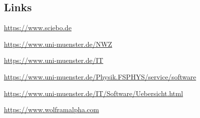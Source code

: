 \begin{multicols*}{2}
\subsection{Links}
\begin{flushleft}
	\begin{fibelurl}
		\url{https://www.sciebo.de}
		\label{internet:sciebo}
	\end{fibelurl}
	\begin{fibelurl}
		\url{https://www.uni-muenster.de/NWZ}
		\label{internet:ivvnwz}
	\end{fibelurl}
	\begin{fibelurl}
		\url{https://www.uni-muenster.de/IT}
		\label{internet:wwuit}
	\end{fibelurl}
	\begin{fibelurl}
		\url{https://www.uni-muenster.de/Physik.FSPHYS/service/software}
		\label{internet:fsphys_software}
	\end{fibelurl}
	\begin{fibelurl}
		\url{https://www.uni-muenster.de/IT/Software/Uebersicht.html}
		\label{internet:wwuit_software}
	\end{fibelurl}
	\begin{fibelurl}
		\url{https://www.wolframalpha.com}
		\label{internet:wolfram_alpha}
	\end{fibelurl}
\end{flushleft}


\medskip

\begin{center}
\end{center}
\end{multicols*}

